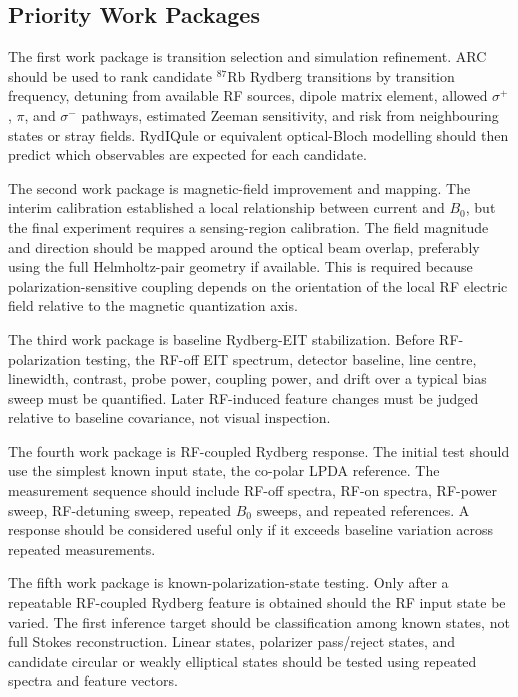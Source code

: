 \documentclass{ieeeaccess}
\begin{document}
\subsection{Priority Work Packages}
\label{subsec:way_forward_work_packages}

The first work package is transition selection and simulation refinement. ARC should be used to rank candidate \(^{87}\mathrm{Rb}\) Rydberg transitions by transition frequency, detuning from available RF sources, dipole matrix element, allowed \(\sigma^+\), \(\pi\), and \(\sigma^-\) pathways, estimated Zeeman sensitivity, and risk from neighbouring states or stray fields. RydIQule or equivalent optical-Bloch modelling should then predict which observables are expected for each candidate.

The second work package is magnetic-field improvement and mapping. The interim calibration established a local relationship between current and \(B_0\), but the final experiment requires a sensing-region calibration. The field magnitude and direction should be mapped around the optical beam overlap, preferably using the full Helmholtz-pair geometry if available. This is required because polarization-sensitive coupling depends on the orientation of the local RF electric field relative to the magnetic quantization axis.

The third work package is baseline Rydberg-EIT stabilization. Before RF-polarization testing, the RF-off EIT spectrum, detector baseline, line centre, linewidth, contrast, probe power, coupling power, and drift over a typical bias sweep must be quantified. Later RF-induced feature changes must be judged relative to baseline covariance, not visual inspection.

The fourth work package is RF-coupled Rydberg response. The initial test should use the simplest known input state, the co-polar LPDA reference. The measurement sequence should include RF-off spectra, RF-on spectra, RF-power sweep, RF-detuning sweep, repeated \(B_0\) sweeps, and repeated references. A response should be considered useful only if it exceeds baseline variation across repeated measurements.

The fifth work package is known-polarization-state testing. Only after a repeatable RF-coupled Rydberg feature is obtained should the RF input state be varied. The first inference target should be classification among known states, not full Stokes reconstruction. Linear states, polarizer pass/reject states, and candidate circular or weakly elliptical states should be tested using repeated spectra and feature vectors.
\end{document}
